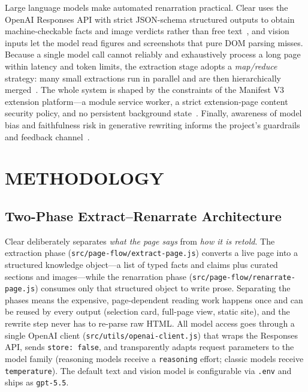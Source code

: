 \documentclass[a4paper,12pt]{report}
\begin{document}
Large language models make automated renarration practical. Clear uses the
OpenAI Responses API with strict JSON-schema structured outputs to obtain
machine-checkable facts and image verdicts rather than free text~\cite{openai},
and vision inputs let the model read figures and screenshots that pure DOM
parsing misses. Because a single model call cannot reliably and exhaustively
process a long page within latency and token limits, the extraction stage adopts
a \emph{map/reduce} strategy: many small extractions run in parallel and are then
hierarchically merged~\cite{mapreduce}. The whole system is shaped by the
constraints of the Manifest V3 extension platform---a module service worker, a
strict extension-page content security policy, and no persistent background
state~\cite{mv3}. Finally, awareness of model bias and faithfulness risk in
generative rewriting informs the project's guardrails and feedback
channel~\cite{parrots}.

\chapter{METHODOLOGY}

\section{Two-Phase Extract--Renarrate Architecture}
Clear deliberately separates \emph{what the page says} from \emph{how it is
retold}. The extraction phase (\texttt{src/page-flow/extract-page.js}) converts a
live page into a structured knowledge object---a list of typed facts and claims
plus curated sections and images---while the renarration phase
(\texttt{src/page-flow/renarrate-page.js}) consumes only that structured object
to write prose. Separating the phases means the expensive, page-dependent reading
work happens once and can be reused by every output (selection card, full-page
view, static site), and the rewrite step never has to re-parse raw HTML. All
model access goes through a single OpenAI client
(\texttt{src/utils/openai-client.js}) that wraps the Responses API, sends
\texttt{store: false}, and transparently adapts request parameters to the model
family (reasoning models receive a \texttt{reasoning} effort; classic models
receive \texttt{temperature}). The default text and vision model is configurable
via \texttt{.env} and ships as \texttt{gpt-5.5}.
\end{document}

